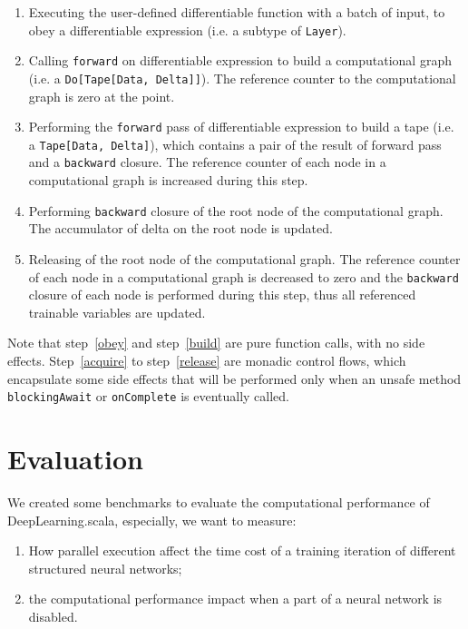 \begin{enumerate}
  \item Executing the user-defined \gls{differentiable function} with a batch of input, to obey a \gls{differentiable expression} (i.e. a subtype of \lstinline{Layer}).
  \label{obey}
  
  \item Calling \lstinline{forward} on \gls{differentiable expression} to build a \gls{computational graph} (i.e. a \lstinline{Do[Tape[Data, Delta]]}). The reference counter to the \gls{computational graph} is zero at the point.
  \label{build}
  
  \item Performing the \lstinline{forward} pass of \gls{differentiable expression} to build a tape (i.e. a \lstinline{Tape[Data, Delta]}), which contains a pair of the result of forward pass and a \lstinline{backward} closure. The reference counter of each node in a \gls{computational graph} is increased during this step.
  \label{acquire}

  \item Performing \lstinline{backward} closure of the root node of the \gls{computational graph}. The accumulator of delta on the root node is updated.

  \item Releasing of the root node of the \gls{computational graph}. The reference counter of each node in a \gls{computational graph} is decreased to zero and the \lstinline{backward} closure of each node is performed during this step, thus all referenced \glspl{trainable variable} are updated.
  \label{release}

\end{enumerate}

Note that step~\ref{obey} and step~\ref{build} are pure function calls, with no side effects. Step~\ref{acquire} to step~\ref{release} are monadic control flows, which encapsulate some side effects that will be performed only when an unsafe method \lstinline{blockingAwait} or \lstinline{onComplete} is eventually called.

\section{Evaluation}

We created some benchmarks to evaluate the computational performance of DeepLearning.scala, especially, we want to measure:

\begin{enumerate}
  \item How parallel execution affect the time cost of a training iteration of different structured neural networks;
  \item the computational performance impact when a part of a neural network is disabled.
\end{enumerate}

